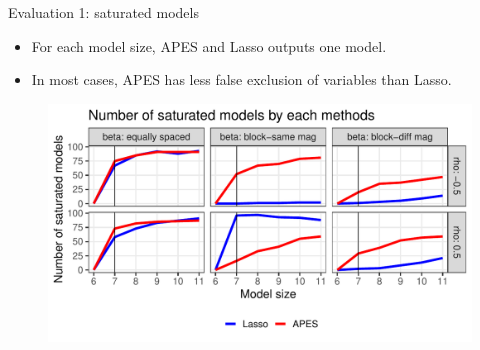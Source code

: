 \documentclass[12pt,aspectratio=169]{beamer}
\begin{document}
%
%
%
%
%
%




\begin{frame}{Evaluation 1: saturated models}

\begin{itemize}
	\item For each model size, APES and Lasso outputs one model. 
	\item In most cases, APES has less false exclusion of variables than Lasso. 
\end{itemize}

\begin{figure}
	\centering
	\includegraphics[width=0.8\linewidth]{ecostaCorrectModelPlot_2018_May_11}
\end{figure}


\end{frame}
\end{document}
